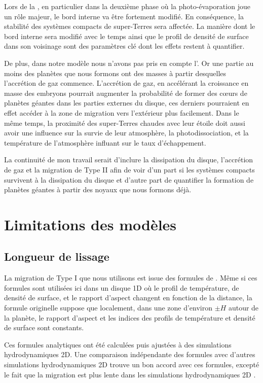 \bigskip

Lors de la , en particulier dans la deuxième phase où la photo-évaporation joue un rôle majeur, le bord interne va être fortement modifié. En conséquence, la stabilité des systèmes compacts de super-Terres sera affectée. La manière dont le bord interne sera modifié avec le temps ainsi que le profil de densité de surface dans son voisinage sont des paramètres clé dont les effets restent à quantifier. 

De plus, dans notre modèle nous n'avons pas pris en compte l'. Or une partie au moins des planètes que nous
formons ont des masses à partir desquelles l'accrétion de gaz commence. L'accrétion de gaz, en accélérant la croissance en
masse des embryons pourrait augmenter la probabilité de former des cœurs de planètes géantes dans les parties externes du
disque, ces derniers pourraient en effet accéder à la zone de migration vers l'extérieur plus facilement. Dans le même temps, la
proximité des super-Terres chaudes avec leur étoile doit aussi avoir une influence sur la survie de leur atmosphère, la photodissociation, et la température de l'atmosphère influant sur le taux d'échappement. 

La continuité de mon travail serait d'inclure la dissipation du disque, l'accrétion de gaz et la migration de Type II afin de voir d'un part si les systèmes compacts survivent à la dissipation du disque et d'autre part de quantifier la formation de planètes géantes à partir des noyaux que nous formons déjà.

\section{Limitations des modèles}
\subsection{Longueur de lissage}
La migration de Type I que nous utilisons est issue des formules de \cite{paardekooper2011torque}. Même si ces formules sont utilisées ici dans un disque 1D où le profil de température, de densité de surface, et le rapport d'aspect changent en fonction de la distance, la formule originelle suppose que localement, dans une zone d'environ $\pm H$ autour de la planète, le rapport d'aspect et les indices des profils de température et densité de surface sont constants. 

Ces formules analytiques ont été calculées puis ajustées à des simulations hydrodynamiques 2D. Une comparaison indépendante des formules avec d'autres simulations hydrodynamiques 2D trouve un bon accord avec ces formules, excepté le fait que la migration est plus lente dans les simulations hydrodynamiques 2D \citep{pierens2013makingaccepted}. 

